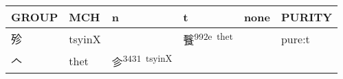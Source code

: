\documentclass[14pt,a4paper]{scrartcl}
\begin{document}
\begin{longtable}[c]{@{}llllll@{}}
\toprule
\begin{minipage}[b]{0.14\columnwidth}\raggedright\strut
GROUP
\strut\end{minipage} &
\begin{minipage}[b]{0.14\columnwidth}\raggedright\strut
MCH
\strut\end{minipage} &
\begin{minipage}[b]{0.14\columnwidth}\raggedright\strut
n
\strut\end{minipage} &
\begin{minipage}[b]{0.14\columnwidth}\raggedright\strut
t
\strut\end{minipage} &
\begin{minipage}[b]{0.14\columnwidth}\raggedright\strut
none
\strut\end{minipage} &
\begin{minipage}[b]{0.14\columnwidth}\raggedright\strut
PURITY
\strut\end{minipage}\tabularnewline
\midrule
\endhead
\begin{minipage}[t]{0.14\columnwidth}\raggedright\strut
殄
\strut\end{minipage} &
\begin{minipage}[t]{0.14\columnwidth}\raggedright\strut
tsyinX
\strut\end{minipage} &
\begin{minipage}[t]{0.14\columnwidth}\raggedright\strut
\strut\end{minipage} &
\begin{minipage}[t]{0.14\columnwidth}\raggedright\strut
餮\textsuperscript{992e~thet}
\strut\end{minipage} &
\begin{minipage}[t]{0.14\columnwidth}\raggedright\strut
\strut\end{minipage} &
\begin{minipage}[t]{0.14\columnwidth}\raggedright\strut
pure:t
\strut\end{minipage}\tabularnewline
\begin{minipage}[t]{0.14\columnwidth}\raggedright\strut
𠆢
\strut\end{minipage} &
\begin{minipage}[t]{0.14\columnwidth}\raggedright\strut
thet
\strut\end{minipage} &
\begin{minipage}[t]{0.14\columnwidth}\raggedright\strut
㐱\textsuperscript{3431~tsyinX}
\strut\end{minipage} &

\end{longtable}
\end{document}
